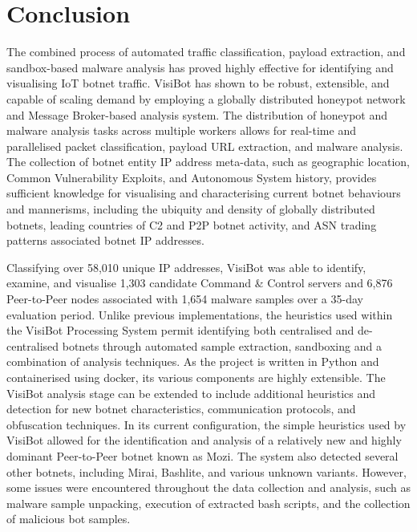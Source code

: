 
\chapter{Conclusion}

The combined process of automated traffic classification, payload extraction, and sandbox-based malware analysis has proved highly effective for identifying and visualising IoT botnet traffic. VisiBot has shown to be robust, extensible, and capable of scaling demand by employing a globally distributed honeypot network and Message Broker-based analysis system. The distribution of honeypot and malware analysis tasks across multiple workers allows for real-time and parallelised packet classification, payload URL extraction, and malware analysis. The collection of botnet entity IP address meta-data, such as geographic location, Common Vulnerability Exploits, and Autonomous System history, provides sufficient knowledge for visualising and characterising current botnet behaviours and mannerisms, including the ubiquity and density of globally distributed botnets, leading countries of C2 and P2P botnet activity, and ASN trading patterns associated botnet IP addresses.

Classifying over 58,010 unique IP addresses, VisiBot was able to identify, examine, and visualise 1,303 candidate Command \& Control servers and 6,876 Peer-to-Peer nodes associated with 1,654 malware samples over a 35-day evaluation period. Unlike previous implementations, the heuristics used within the VisiBot Processing System permit identifying both centralised and de-centralised botnets through automated sample extraction, sandboxing and a combination of analysis techniques. As the project is written in Python and containerised using docker, its various components are highly extensible. The VisiBot analysis stage can be extended to include additional heuristics and detection for new botnet characteristics, communication protocols, and obfuscation techniques. In its current configuration, the simple heuristics used by VisiBot allowed for the identification and analysis of a relatively new and highly dominant Peer-to-Peer botnet known as Mozi. The system also detected several other botnets, including Mirai, Bashlite, and various unknown variants. However, some issues were encountered throughout the data collection and analysis, such as malware sample unpacking, execution of extracted bash scripts, and the collection of malicious bot samples.

